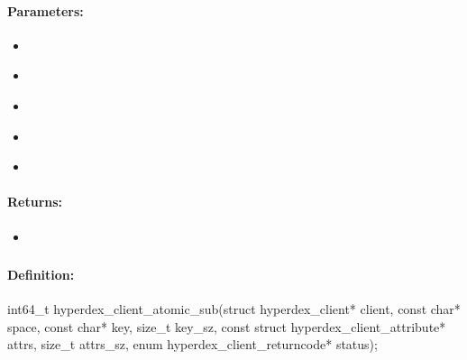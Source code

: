 \paragraph{Parameters:}
\begin{itemize}[noitemsep]
\item {}\\

\item {}\\

\item {}\\

\item {}\\

\item {}\\

\end{itemize}

\paragraph{Returns:}
\begin{itemize}[noitemsep]
\item {}\\

\end{itemize}

\pagebreak
\subsubsection{}
\label{api:c:atomic_sub}


\paragraph{Definition:}
\begin{ccode}
int64_t hyperdex_client_atomic_sub(struct hyperdex_client* client,
        const char* space,
        const char* key, size_t key_sz,
        const struct hyperdex_client_attribute* attrs, size_t attrs_sz,
        enum hyperdex_client_returncode* status);
\end{ccode}

